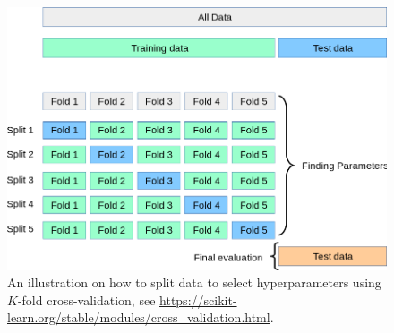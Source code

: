 \begin{figure}
\label{fig:cv:grid}
\begin{center}
\includegraphics[width = .7\linewidth]{./Illustrations/grid_search_cross_validation}
\end{center}
\caption{An illustration on how to split data to select hyperparameters using $K$-fold cross-validation, see \url{https://scikit-learn.org/stable/modules/cross\_validation.html}.}
\end{figure}



